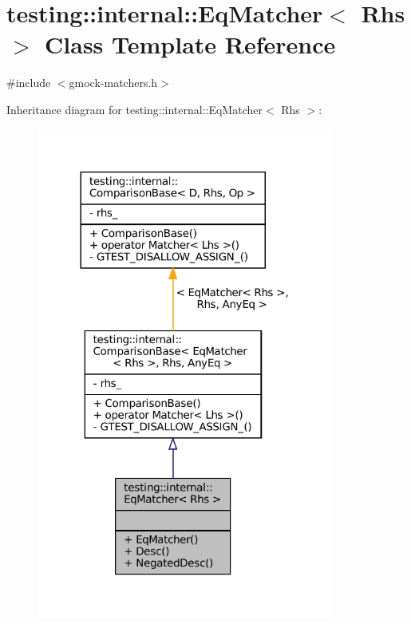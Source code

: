 \hypertarget{classtesting_1_1internal_1_1EqMatcher}{}\section{testing\+:\+:internal\+:\+:Eq\+Matcher$<$ Rhs $>$ Class Template Reference}
\label{classtesting_1_1internal_1_1EqMatcher}


{\ttfamily \#include $<$gmock-\/matchers.\+h$>$}



Inheritance diagram for testing\+:\+:internal\+:\+:Eq\+Matcher$<$ Rhs $>$\+:
\nopagebreak
\begin{figure}[H]
\begin{center}
\leavevmode
\includegraphics[width=276pt]{classtesting_1_1internal_1_1EqMatcher__inherit__graph}
\end{center}
\end{figure}



